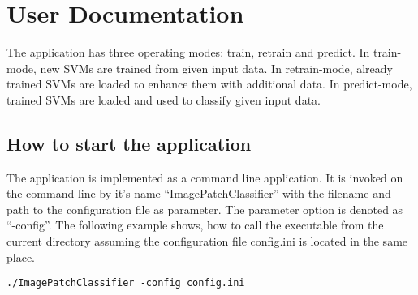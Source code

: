 \appendix
\appendixpage
\addappheadtotoc

\section{User Documentation}\label{sec:userdoc}

The application has three operating modes: train, retrain and predict. In train-mode, new SVMs are trained from given input data. In retrain-mode, already trained SVMs are loaded to enhance them with additional data. In predict-mode, trained SVMs are loaded and used to classify given input data.


\subsection{How to start the application}
The application is implemented as a command line application. It is invoked on the command line by it's name "`ImagePatchClassifier"' with the filename and path to the configuration file as parameter. The parameter option is denoted as "`-config"'. The following example shows, how to call the executable from the current directory assuming the configuration file config.ini is located in the same place.
\begin{verbatim}
./ImagePatchClassifier -config config.ini
\end{verbatim}





